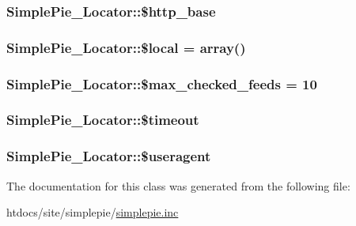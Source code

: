\hypertarget{class_simple_pie___locator_a5993c7d5ba64b1c4312333af7bce300e}{
\subsubsection[{\$http\-\_\-base}]{\setlength{\rightskip}{0pt plus 5cm}Simple\-Pie\-\_\-\-Locator\-::\$http\-\_\-base}}\label{class_simple_pie___locator_a5993c7d5ba64b1c4312333af7bce300e}
\hypertarget{class_simple_pie___locator_a8aacc6eeac78a948de542d1ee1590ae8}{
\subsubsection[{\$local}]{\setlength{\rightskip}{0pt plus 5cm}Simple\-Pie\-\_\-\-Locator\-::\$local = array()}}\label{class_simple_pie___locator_a8aacc6eeac78a948de542d1ee1590ae8}
\hypertarget{class_simple_pie___locator_a3becfac82d8027e819825b1d1387ad1c}{
\subsubsection[{\$max\-\_\-checked\-\_\-feeds}]{\setlength{\rightskip}{0pt plus 5cm}Simple\-Pie\-\_\-\-Locator\-::\$max\-\_\-checked\-\_\-feeds = 10}}\label{class_simple_pie___locator_a3becfac82d8027e819825b1d1387ad1c}
\hypertarget{class_simple_pie___locator_ad6fdd2fb4344655b3cd8cecc73e27fc6}{
\subsubsection[{\$timeout}]{\setlength{\rightskip}{0pt plus 5cm}Simple\-Pie\-\_\-\-Locator\-::\$timeout}}\label{class_simple_pie___locator_ad6fdd2fb4344655b3cd8cecc73e27fc6}
\hypertarget{class_simple_pie___locator_ae106f9aede06885065593330914f7d12}{
\subsubsection[{\$useragent}]{\setlength{\rightskip}{0pt plus 5cm}Simple\-Pie\-\_\-\-Locator\-::\$useragent}}\label{class_simple_pie___locator_ae106f9aede06885065593330914f7d12}


The documentation for this class was generated from the following file\-:\begin{DoxyCompactItemize}
\item 
htdocs/site/simplepie/\hyperlink{simplepie_8inc}{simplepie.\-inc}\end{DoxyCompactItemize}
